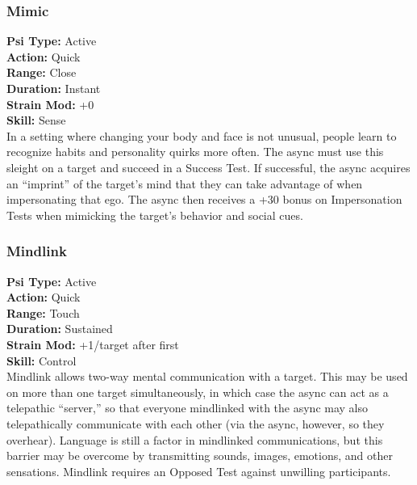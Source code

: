 \subsubsection{Mimic} \textbf{Psi Type:} Active \\ \textbf{Action:} Quick \\ \textbf{Range:} Close \\ \textbf{Duration:} Instant \\ \textbf{Strain Mod:} +0 \\ \textbf{Skill:} Sense\\ In a setting where changing your body and face is not unusual, people learn to recognize habits and personality quirks more often. The async must use this sleight on a target and succeed in a Success Test. If successful, the async acquires an “imprint” of the target’s mind that they can take advantage of when impersonating that ego. The async then receives a +30 bonus on Impersonation Tests when mimicking the target’s behavior and social cues. 

\subsubsection{Mindlink} \textbf{Psi Type:} Active \\ \textbf{Action:} Quick \\ \textbf{Range:} Touch \\ \textbf{Duration:} Sustained \\ \textbf{Strain Mod:} +1/target after first \\ \textbf{Skill:} Control\\ Mindlink allows two-way mental communication with a target. This may be used on more than one target simultaneously, in which case the async can act as a telepathic “server,” so that everyone mindlinked with the async may also telepathically communicate with each other (via the async, however, so they overhear). Language is still a factor in mindlinked communications, but this barrier may be overcome by transmitting sounds, images, emotions, and other sensations. Mindlink requires an Opposed Test against unwilling participants. 

